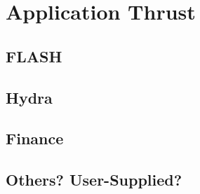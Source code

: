 \section{Application Thrust}

\subsection{FLASH}

\subsection{Hydra}

\subsection{Finance}

\subsection{Others? User-Supplied?}
